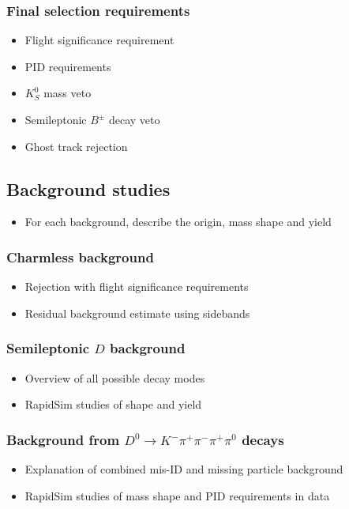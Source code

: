 \documentclass[12pt, a4paper, notitlepage, onecolumn]{article}
\begin{document}
\subsubsection{Final selection requirements}
  \begin{itemize}[nosep]
    \setlength{\itemindent}{2.5em}
    \item[\textasteriskcentered]{Flight significance requirement}
    \item[\textasteriskcentered]{PID requirements}
    \item[\textasteriskcentered]{$K^0_S$ mass veto}
    \item[\textasteriskcentered]{Semileptonic $B^\pm$ decay veto}
    \item[\textasteriskcentered]{Ghost track rejection}
  \end{itemize}
\subsection{Background studies}
  \begin{itemize}[nosep]
    \setlength{\itemindent}{2em}
    \item[\textendash]{For each background, describe the origin, mass shape and yield}
  \end{itemize}
\subsubsection{Charmless background}
  \begin{itemize}[nosep]
    \setlength{\itemindent}{2.5em}
    \item[\textasteriskcentered]{Rejection with flight significance requirements}
    \item[\textasteriskcentered]{Residual background estimate using sidebands}
  \end{itemize}
\subsubsection{Semileptonic \texorpdfstring{$D$}{D} background}
  \begin{itemize}[nosep]
    \setlength{\itemindent}{2.5em}
    \item[\textasteriskcentered]{Overview of all possible decay modes}
    \item[\textasteriskcentered]{RapidSim studies of shape and yield}
  \end{itemize}
\subsubsection{Background from \texorpdfstring{$D^0\to K^-\pi^+\pi^-\pi^+\pi^0$}{D02Kpipipipi0} decays}
  \begin{itemize}[nosep]
    \setlength{\itemindent}{2.5em}
    \item[\textasteriskcentered]{Explanation of combined mis-ID and missing particle background}
    \item[\textasteriskcentered]{RapidSim studies of mass shape and PID requirements in data}
  \end{itemize}
\end{document}
